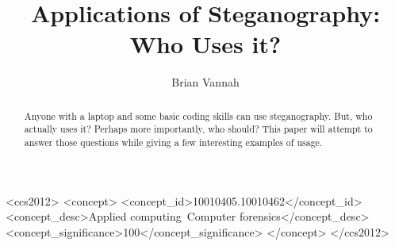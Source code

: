 \documentclass[sigconf]{acmart}
\begin{document}
\title{Applications of Steganography: Who Uses it?}
\author{Brian Vannah}
\begin{abstract}
Anyone with a laptop and some basic coding skills can use steganography. But, who actually uses it? Perhaps more importantly, who should? This paper will attempt to answer those questions while giving a few interesting examples of usage. 
\end{abstract}

 \begin{CCSXML}
<ccs2012>
<concept>
<concept_id>10010405.10010462</concept_id>
<concept_desc>Applied computing~Computer forensics</concept_desc>
<concept_significance>100</concept_significance>
</concept>
</ccs2012>
\end{CCSXML}



\maketitle






\end{document}
